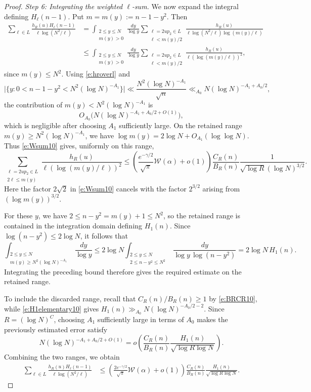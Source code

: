 \documentclass[12pt,reqno]{amsart}
\numberwithin{equation}{section}
\theoremstyle{definition}
\theoremstyle{remark}
\begin{document}
\begin{proof}
\emph{Step 6: Integrating the weighted \(\ell\)-sum.}
We now expand the integral defining \(H_\ell(n-1)\).  Put
\(m=m(y):=n-1-y^2\).  Then
\begin{align*}
 \sum_{\ell\in L}
 \frac{h_R(u)H_\ell(n-1)}
 {\ell\log(N^2/\ell)}
 &=
 \int_{\substack{2\leq y\leq N\\ m(y)>0}}
 \frac{dy}{\log y}
 \sum_{\substack{\ell=2up_2\in L\\ \ell<m(y)/2}}
 \frac{h_R(u)}
 {\ell\log(N^2/\ell)\log(m(y)/\ell)}  \\
 &\leq
 \int_{\substack{2\leq y\leq N\\ m(y)>0}}
 \frac{dy}{\log y}
 \sum_{\substack{\ell=2up_2\in L\\ \ell<m(y)/2}}
 \frac{h_R(u)}
 {\ell(\log(m(y)/\ell))^2},
\end{align*}
since \(m(y)\leq N^2\).  Using \eqref{e:hroverl} and
\[
 \bigl|\{y:0<n-1-y^2<N^2(\log N)^{-A_1}\}\bigr|
 \ll
 \frac{N^2(\log N)^{-A_1}}{\sqrt n}
 \ll_{A_0}N(\log N)^{-A_1+A_0/2},
\]
the contribution of \(m(y)<N^2(\log N)^{-A_1}\) is
\[
 O_{A_0}\bigl(N(\log N)^{-A_1+A_0/2+O(1)}\bigr),
\]
which is negligible after choosing \(A_1\) sufficiently large. On the retained range \(m(y)\geq N^2(\log N)^{-A_1}\), we have $ \log m(y)=2\log N+O_{A_1}(\log\log N).$
Thus \eqref{e:Wsum10} gives, uniformly on this range,
\[
 \sum_{\substack{\ell=2up_2\in L\\2\ell\leq m(y)}}
 \frac{h_R(u)}{\ell(\log(m(y)/\ell))^2}
 \leq
 \left(\frac{e^{-\gamma/2}}{\sqrt\pi}
 \mathcal W(\alpha)+o(1)\right)
 \frac{C_R(n)}{B_R(n)}
 \frac{1}{\sqrt{\log R}(\log N)^{3/2}}.
\]
Here the factor \(2\sqrt2\) in \eqref{e:Wsum10} cancels with
the factor \(2^{3/2}\) arising from \((\log m(y))^{3/2}\).

For these \(y\), we have
\(2\leq n-y^2=m(y)+1\leq N^2\), so the retained range is
contained in the integration domain defining \(H_1(n)\).
Since \(\log(n-y^2)\leq2\log N\), it follows that
\[
 \int_{\substack{2\leq y\leq N\\
                 m(y)\geq N^2(\log N)^{-A_1}}}
 \frac{dy}{\log y}
 \leq
 2\log N
 \int_{\substack{2\leq y\leq N\\2\leq n-y^2\leq N^2}}
 \frac{dy}{\log y\,\log(n-y^2)}
 =
 2\log N\,H_1(n).
\]
Integrating the preceding bound therefore gives the required
estimate on the retained range.

To include the discarded range, recall that
\(C_R(n)/B_R(n)\geq1\) by \eqref{e:BRCR10}, while
\eqref{e:H1elementary10} gives
\(H_1(n)\gg_{A_0}N(\log N)^{-A_0/2-2}\).
Since \(R=(\log N)^C\), choosing \(A_1\) sufficiently large
in terms of \(A_0\) makes the previously estimated error satisfy
\[
 N(\log N)^{-A_1+A_0/2+O(1)}
 =
 o\left(
 \frac{C_R(n)}{B_R(n)}
 \frac{H_1(n)}{\sqrt{\log R\log N}}
 \right).
\]
Combining the two ranges, we obtain
\begin{align}\label{e:integratedW10}
 \sum_{\ell\in L}
 \frac{h_R(u)H_\ell(n-1)}
 {\ell\log(N^2/\ell)}
 &\leq
 \left(\frac{2e^{-\gamma/2}}{\sqrt\pi}
 \mathcal W(\alpha)+o(1)\right)
 \frac{C_R(n)}{B_R(n)}
 \frac{H_1(n)}{\sqrt{\log R\log N}}.
\end{align}



\end{proof}
\end{document}
